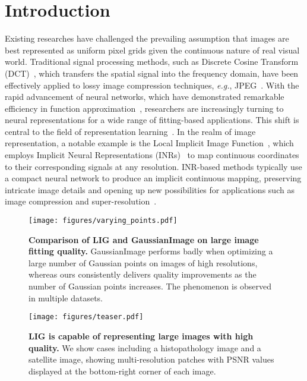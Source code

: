 \section{Introduction}

Existing researches have challenged the prevailing assumption that images are best represented as uniform pixel grids given the continuous nature of real visual world. Traditional signal processing methods, such as Discrete Cosine Transform (DCT)~\cite{khayam2003discrete}, which transfers the spatial signal into the frequency domain, have been effectively applied to lossy image compression techniques, \textit{e.g.}, JPEG~\cite{rabbani2002overview}. With the rapid advancement of neural networks, which have demonstrated remarkable efficiency in function approximation~\cite{lecun2015deep}, researchers are increasingly turning to neural representations for a wide range of fitting-based applications. This shift is central to the field of representation learning~\cite{bengio2013representation}. In the realm of image representation, a notable example is the Local Implicit Image Function~\cite{chen2021learning}, which employs Implicit Neural Representations (INRs)~\cite{chen2019learning, sitzmann2020implicit, park2019deepsdf} to map continuous coordinates to their corresponding signals at any resolution. INR-based methods typically use a compact neural network to produce an implicit continuous mapping, preserving intricate image details and opening up new possibilities for applications such as image compression and super-resolution~\cite{dupont2021coin,chen2021learning, ma2022recovering, strumpler2022implicit}.

\begin{figure}[t]
\centering
\texttt{[image: figures/varying\_points.pdf]}
\caption{\textbf{Comparison of LIG and GaussianImage on large image fitting quality.} GaussianImage performs badly when optimizing a large number of Gaussian points on images of high resolutions, whereas ours consistently delivers quality improvements as the number of Gaussian points increases. The phenomenon is observed in multiple datasets.}
\label{varying_points}
\end{figure}

\begin{figure*}[t]
\centering
\texttt{[image: figures/teaser.pdf]}
\caption{\textbf{LIG is capable of representing large images with high quality.} We show cases including a histopathology image and a satellite image, showing multi-resolution patches with PSNR values displayed at the bottom-right corner of each image.} 
\label{teaser}
\end{figure*}

